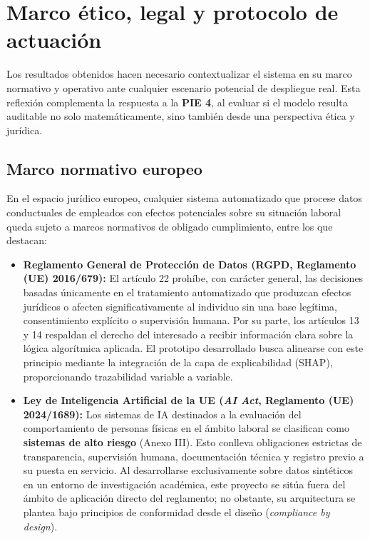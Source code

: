 \documentclass[IB]{TFUOC}%
\begin{document}
\section{Marco ético, legal y protocolo de actuación}
Los resultados obtenidos hacen necesario contextualizar el sistema en su marco normativo y operativo ante cualquier escenario potencial de despliegue real. Esta reflexión complementa la respuesta a la \textbf{PIE 4}, al evaluar si el modelo resulta auditable no solo matemáticamente, sino también desde una perspectiva ética y jurídica.

\subsection*{Marco normativo europeo}
En el espacio jurídico europeo, cualquier sistema automatizado que procese datos conductuales de empleados con efectos potenciales sobre su situación laboral queda sujeto a marcos normativos de obligado cumplimiento, entre los que destacan:

\begin{itemize}
    \item \textbf{Reglamento General de Protección de Datos (RGPD, Reglamento (UE) 2016/679):} El artículo 22 prohíbe, con carácter general, las decisiones basadas únicamente en el tratamiento automatizado que produzcan efectos jurídicos o afecten significativamente al individuo sin una base legítima, consentimiento explícito o supervisión humana. Por su parte, los artículos 13 y 14 respaldan el derecho del interesado a recibir información clara sobre la lógica algorítmica aplicada. El prototipo desarrollado busca alinearse con este principio mediante la integración de la capa de explicabilidad (SHAP), proporcionando trazabilidad variable a variable.
    
    \item \textbf{Ley de Inteligencia Artificial de la UE (\textit{AI Act}, Reglamento (UE) 2024/1689):} Los sistemas de IA destinados a la evaluación del comportamiento de personas físicas en el ámbito laboral se clasifican como \textbf{sistemas de alto riesgo} (Anexo III). Esto conlleva obligaciones estrictas de transparencia, supervisión humana, documentación técnica y registro previo a su puesta en servicio. Al desarrollarse exclusivamente sobre datos sintéticos en un entorno de investigación académica, este proyecto se sitúa fuera del ámbito de aplicación directo del reglamento; no obstante, su arquitectura se plantea bajo principios de conformidad desde el diseño (\textit{compliance by design}).
\end{itemize}
\end{document}
